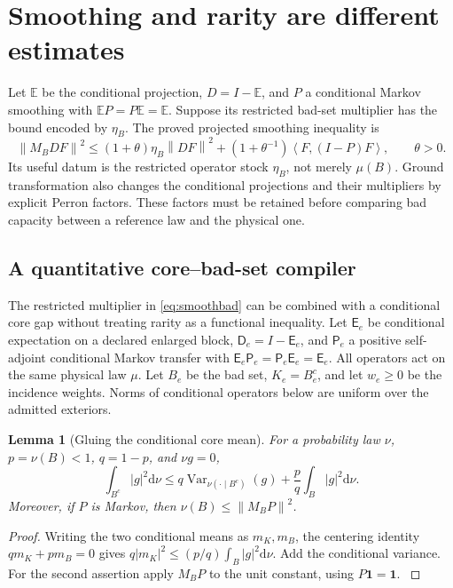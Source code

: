 \documentclass[11pt,oneside,openany]{book}
\newtheorem{lemma}[lemma]{Lemma}
\theoremstyle{definition}
\theoremstyle{remark}
\newcommand{\E}{\mathbb E}
\newcommand{\one}{\mathbf1}
\newcommand{\dd}{\mathrm d}
\newcommand{\Var}{\operatorname{Var}}
\newcommand{\norm}[1]{\left\lVert#1\right\rVert}
\newcommand{\ip}[2]{\left\langle#1,#2\right\rangle}
\newcommand{\src}[2]{\cite[#2]{#1}}
\begin{document}
\section{Smoothing and rarity are different estimates}
Let $\E$ be the conditional projection, $D=I-\E$, and $P$ a conditional Markov smoothing with $\E P=P\E=\E$. Suppose its restricted bad-set multiplier has the bound encoded by $\eta_B$. The proved projected smoothing inequality is
\begin{equation}\label{eq:smoothbad}
\norm{M_BDF}^2
\le(1+\theta)\eta_B\norm{DF}^2
 +(1+\theta^{-1})\ip{F}{(I-P)F},\qquad\theta>0.
\end{equation}
Its useful datum is the restricted operator stock $\eta_B$, not merely $\mu(B)$. Ground transformation also changes the conditional projections and their multipliers by explicit Perron factors. These factors must be retained before comparing bad capacity between a reference law and the physical one.

\subsection{A quantitative core--bad-set compiler}
The restricted multiplier in \cref{eq:smoothbad} can be combined with a
conditional core gap without treating rarity as a functional inequality.
Let $\mathsf E_e$ be conditional expectation on a declared enlarged
block, $\mathsf D_e=I-\mathsf E_e$, and $\mathsf P_e$ a positive
self-adjoint conditional Markov transfer with
$\mathsf E_e\mathsf P_e=\mathsf P_e\mathsf E_e=\mathsf E_e$.
All operators act on the same physical law $\mu$. Let $B_e$ be the bad
set, $K_e=B_e^c$, and let $w_e\ge0$ be the incidence weights. Norms of
conditional operators below are uniform over the admitted exteriors.

\begin{lemma}[Gluing the conditional core mean]
\label{lem:core-mean-gluing}
For a probability law $\nu$, $p=\nu(B)<1$, $q=1-p$, and $\nu g=0$,
\begin{equation}\label{eq:core-mean-gluing}
\int_{B^c}|g|^2\dd\nu
\le q\Var_{\nu(\cdot\mid B^c)}(g)
  +\frac pq\int_B|g|^2\dd\nu.
\end{equation}
Moreover, if $P$ is Markov, then
$\nu(B)\le\norm{M_BP}^2$.
\end{lemma}
\begin{proof}
Writing the two conditional means as $m_K,m_B$, the centering identity
$q m_K+p m_B=0$ gives
$q|m_K|^2\le(p/q)\int_B|g|^2\dd\nu$. Add the conditional variance.
For the second assertion apply $M_BP$ to the unit constant, using
$P\one=\one$. \src{F6}{V97}
\end{proof}
\end{document}
